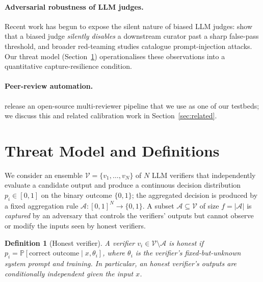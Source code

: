 \documentclass[11pt]{article}
\newtheorem{definition}{Definition}
\newcommand{\V}{\mathcal{V}}            %
\newcommand{\A}{\mathcal{A}}            %
\begin{document}
\paragraph{Adversarial robustness of LLM judges.}
Recent work has begun to expose the silent nature of biased LLM
judges: \citet{zhang2026blindcurator} show that a biased judge
\emph{silently disables} a downstream curator past a sharp false-pass
threshold, and broader red-teaming studies
\citep{perez2022red,schulhoff2023ignore} catalogue prompt-injection
attacks. Our threat model (Section~\ref{sec:threat}) operationalises
these observations into a quantitative capture-resilience condition.

\paragraph{Peer-review automation.}
\citet{liu2026paperreviewtoolkit} release an open-source multi-reviewer
pipeline that we use as one of our testbeds; we discuss this and
related calibration work \citep{liu2026calibration} in
Section~\ref{sec:related}.

\section{Threat Model and Definitions}
\label{sec:threat}

We consider an ensemble $\V = \{v_1, \ldots, v_N\}$ of $N$ LLM verifiers
that independently evaluate a candidate output and produce a continuous
decision distribution $p_i \in [0,1]$ on the binary outcome
$\{0,1\}$; the aggregated decision is produced by a fixed aggregation rule
$\mathcal{A}: [0,1]^N \to \{0,1\}$. A subset $\A \subseteq \V$ of size
$f = |\A|$ is \emph{captured} by an adversary that controls the verifiers'
outputs but cannot observe or modify the inputs seen by honest verifiers.

\begin{definition}[Honest verifier]
\label{def:honest}
A verifier $v_i \in \V \setminus \A$ is \emph{honest} if
$p_i = \mathbb{P}[\text{correct outcome} \mid x, \theta_i]$, where $\theta_i$
is the verifier's fixed-but-unknown system prompt and training. In
particular, an honest verifier's outputs are conditionally independent
given the input $x$.
\end{definition}
\end{document}
